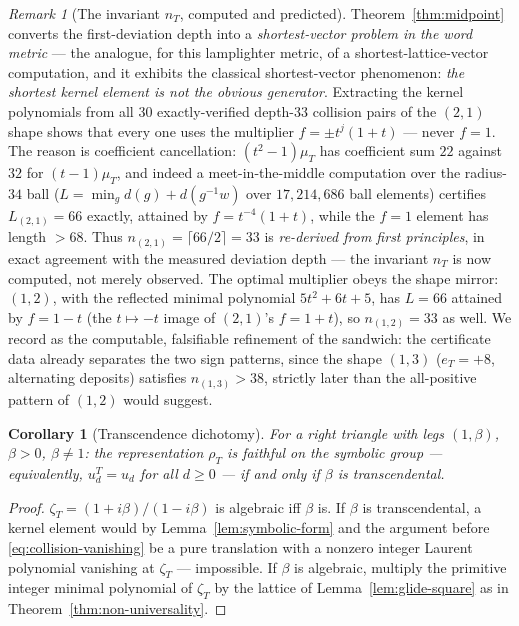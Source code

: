 \documentclass[11pt,a4paper]{article}
\newtheorem{corollary}[theorem]{Corollary}
\theoremstyle{remark}
\newtheorem{remark}[theorem]{Remark}
\theoremstyle{plain}
\begin{document}
\begin{remark}[The invariant $n_T$, computed and predicted]
\label{rem:nT-values}
Theorem~\ref{thm:midpoint} converts the first-deviation depth into a
\emph{shortest-vector problem in the word metric} --- the analogue, for
this lamplighter metric, of a shortest-lattice-vector computation, and
it exhibits the classical shortest-vector phenomenon: \emph{the
shortest kernel element is not the obvious generator}.  Extracting the
kernel polynomials from all $30$ exactly-verified depth-$33$ collision
pairs of the $(2,1)$ shape shows that every one uses the multiplier
$f = \pm t^{j}(1+t)$ --- never $f = 1$.  The reason is coefficient
cancellation: $(t^2-1)\mu_T$ has coefficient sum $22$ against $32$ for
$(t-1)\mu_T$, and indeed a meet-in-the-middle computation over the
radius-$34$ ball ($L = \min_g d(g) + d(g^{-1}w)$ over $17{,}214{,}686$
ball elements) certifies $L_{(2,1)} = 66$ exactly, attained by
$f = t^{-4}(1+t)$, while the $f = 1$ element has length $> 68$.  Thus
$n_{(2,1)} = \lceil 66/2 \rceil = 33$ is \emph{re-derived from first
principles}, in exact agreement with the measured deviation depth ---
the invariant $n_T$ is now computed, not merely observed.  The optimal
multiplier obeys the shape mirror: $(1,2)$, with the reflected minimal
polynomial $5t^2 + 6t + 5$, has $L = 66$ attained by $f = 1 - t$ (the
$t \mapsto -t$ image of $(2,1)$'s $f = 1 + t$), so $n_{(1,2)} = 33$
as well.  We record as the computable, falsifiable
refinement of the sandwich: the certificate data already separates the
two sign patterns, since the shape $(1,3)$ ($e_T = +8$, alternating
deposits) satisfies $n_{(1,3)} > 38$, strictly later than the
all-positive pattern of $(1,2)$ would suggest.
\end{remark}

\begin{corollary}[Transcendence dichotomy]
\label{cor:dichotomy}
For a right triangle with legs $(1, \beta)$, $\beta > 0$,
$\beta \neq 1$: the representation $\rho_T$ is faithful on the
symbolic group --- equivalently, $u_d^T = u_d$ for \emph{all}
$d \ge 0$ --- if and only if $\beta$ is transcendental.
\end{corollary}

\begin{proof}
$\zeta_T = (1+i\beta)/(1-i\beta)$ is algebraic iff $\beta$ is.  If
$\beta$ is transcendental, a kernel element would by
Lemma~\ref{lem:symbolic-form} and the argument before
\eqref{eq:collision-vanishing} be a pure translation with a nonzero
integer Laurent polynomial vanishing at $\zeta_T$ --- impossible.  If
$\beta$ is algebraic, multiply the primitive integer minimal polynomial
of $\zeta_T$ by the lattice of Lemma~\ref{lem:glide-square} as in
Theorem~\ref{thm:non-universality}.
\end{proof}
\end{document}
